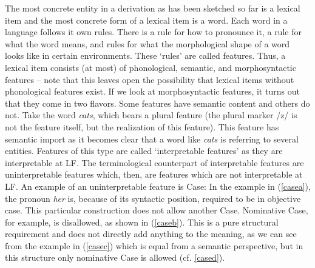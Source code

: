 The most concrete entity in a derivation as has been sketched so far is a lexical item and the most concrete form of a lexical item is a word. Each word in a language follows it own rules. There is a rule for how to pronounce it, a rule for what the word means, and rules for what the morphological shape of a word looks like in certain environments. These `rules' are called features. Thus, a lexical item consists (at most) of phonological, semantic, and morphosyntactic features -- note that this leaves open the possibility that lexical items without phonological features exist. If we look at morphosyntactic features, it turns out that they come in two flavors. Some features have semantic content and others do not. Take the word \textit{cats}, which bears a plural feature (the plural marker /z/ is not the feature itself, but the realization of this feature). This feature has semantic import as it becomes clear that a word like \textit{cats} is referring to several entities. Features of this type are called `interpretable features' as they are interpretable at LF. The terminological counterpart of interpretable features are uninterpretable features which, then, are features which are not interpretable at LF. An example of an uninterpretable feature is Case: In the example in (\ref{casea}), the pronoun \textit{her} is, because of its syntactic position, required to be in objective case. This particular construction does not allow another Case. Nominative Case, for example, is disallowed, as shown in (\ref{caseb}). This is a pure structural requirement and does not directly add anything to the meaning, as we can see from the example in (\ref{casec}) which is equal from a semantic perspective, but in this structure only nominative Case is allowed (cf. \ref{cased}). 

\begin{exe}
\ex\label{case}\begin{xlist}
\end{xlist}
\end{exe}

